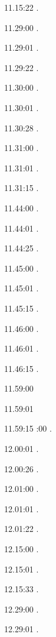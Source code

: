 \documentclass[italian]{article}
\begin{document}
11.15:22   . 

11.29:00   . 

11.29:01   . 

11.29:22   . 

11.30:00   .

11.30:01   .

11.30:28   .

11.31:00   .

11.31:01   .

11.31:15   .

11.44:00   .

11.44:01   .

11.44:25   .

11.45:00   .

11.45:01   .

11.45:15   .

11.46:00   .

11.46:01   .

11.46:15   .

11.59:00   

11.59:01   

11.59:15   
:00   .

12.00:01  .

12.00:26   .

12.01:00    . 

12.01:01    . 

12.01:22    . 

12.15:00   . 

12.15:01    . 

12.15:33    . 

12.29:00    . 

12.29:01    .
\end{document}
